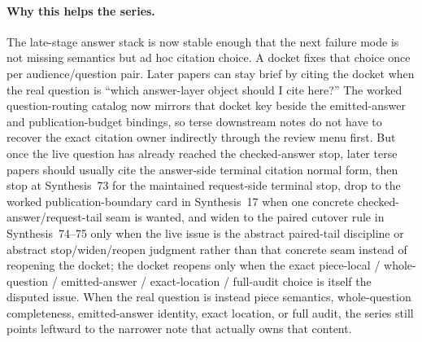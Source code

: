 \documentclass[11pt]{article}
\begin{document}
\paragraph{Why this helps the series.}
The late-stage answer stack is now stable enough that the next failure mode is not missing semantics but ad hoc citation choice.
A docket fixes that choice once per audience/question pair.
Later papers can stay brief by citing the docket when the real question is ``which answer-layer object should I cite here?'' The worked question-routing catalog now mirrors that docket key beside the emitted-answer and publication-budget bindings, so terse downstream notes do not have to recover the exact citation owner indirectly through the review menu first.
But once the live question has already reached the checked-answer stop, later terse papers should usually cite the answer-side terminal citation normal form, then stop at Synthesis~73 for the maintained request-side terminal stop, drop to the worked publication-boundary card in Synthesis~17 when one concrete checked-answer/request-tail seam is wanted, and widen to the paired cutover rule in Synthesis~74--75 only when the live issue is the abstract paired-tail discipline or abstract stop/widen/reopen judgment rather than that concrete seam instead of reopening the docket; the docket reopens only when the exact piece-local / whole-question / emitted-answer / exact-location / full-audit choice is itself the disputed issue.\cite{series:challengeanswerreviewmenus,series:workedexample,series:pairedterminalcitationdiscipline,series:pairedterminalcutoverrules}
When the real question is instead piece semantics, whole-question completeness, emitted-answer identity, exact location, or full audit, the series still points leftward to the narrower note that actually owns that content.
\end{document}
